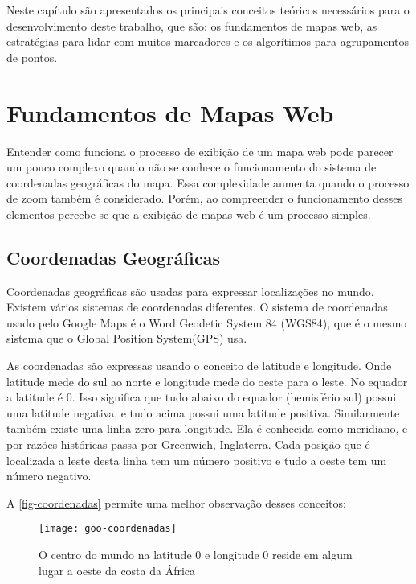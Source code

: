 Neste capítulo são apresentados os principais conceitos teóricos necessários para o desenvolvimento deste trabalho, que são: os fundamentos de mapas web, as estratégias para lidar com muitos marcadores e os algorítimos para agrupamentos de pontos.

\section{Fundamentos de Mapas Web}
	Entender como funciona o processo de exibição de um mapa web pode parecer um pouco complexo quando não se conhece o funcionamento do sistema de coordenadas geográficas do mapa. Essa complexidade aumenta quando o processo de zoom também é considerado. Porém, ao compreender o funcionamento desses elementos percebe-se que a exibição de mapas web é um processo simples.
	
	\subsection{Coordenadas Geográficas}
	Coordenadas geográficas são usadas para expressar localizações no mundo. Existem vários sistemas de coordenadas diferentes. O sistema de coordenadas usado pelo Google Maps é o Word Geodetic System 84 (WGS84), que é o mesmo sistema que o Global Position System(GPS) usa.
	
	As coordenadas são expressas usando o conceito de latitude e longitude. Onde latitude mede do sul ao norte e longitude mede do oeste para o leste. No equador a latitude é 0. Isso significa que tudo abaixo do equador (hemisfério sul) possui uma latitude negativa, e tudo acima possui uma latitude positiva. Similarmente também existe uma linha zero para longitude. Ela é conhecida como meridiano, e por razões históricas passa por Greenwich, Inglaterra. Cada posição que é localizada a leste desta linha tem um número positivo e tudo a oeste tem um número negativo\cite[4]{livroGoogleApiV3}. 
	
	A \autoref{fig-coordenadas} permite uma melhor observação desses conceitos:
	\begin{figure}[htb]
	\caption{\label{fig-coordenadas} O centro do mundo na latitude 0 e longitude 0 reside em algum lugar a oeste da costa da África}
	\begin{center}
	    \texttt{[image: goo-coordenadas]}
	\end{center}
	\end{figure}
	

